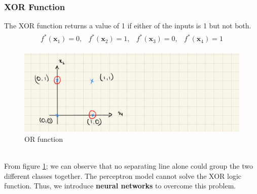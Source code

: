 \subsubsection*{XOR Function}
The XOR function returns a value of 1 if either of the inputs is 1 but not both.
\begin{align}
  \begin{matrix}
    f^{*}(\textbf{x}_1)=0,&   f^{*}(\textbf{x}_2)=1 ,& f^{*}(\textbf{x}_3)=0,&   f^{*}(\textbf{x}_4)=1    
  \end{matrix}
\end{align} 
\begin{figure}[h]
  \centering
  \includegraphics[scale=0.15]{CHAPTER_2/c2_rig_XOR.jpeg}
  \caption{OR function}
  \label{XOR_function}
\end{figure} \\
\noindent From figure \ref{XOR_function}; we can observe that no separating line alone could group the two different classes together. The perceptron model cannot solve the XOR logic function. Thus, we introduce \textbf{neural networks} to overcome this problem.
